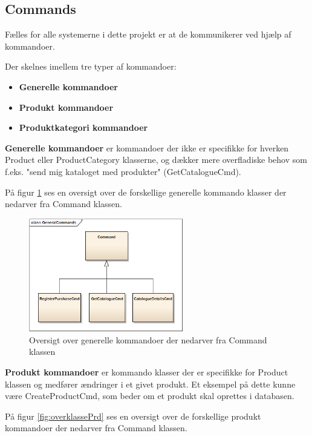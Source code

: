 \subsection{Commands}\label{COMMAND}
Fælles for alle systemerne i dette projekt er at de kommunikerer ved hjælp af kommandoer. 

Der skelnes imellem tre typer af kommandoer:

\begin{itemize}
\item \textbf{Generelle kommandoer} 
\item \textbf{Produkt kommandoer} 
\item \textbf{Produktkategori kommandoer}
\end{itemize}

\textbf{Generelle kommandoer} er kommandoer der ikke er specifikke for hverken Product eller ProductCategory klasserne, og dækker mere overfladiske behov som f.eks. "send mig kataloget med produkter" (GetCatalogueCmd).

På figur \ref{fig:overklasseGen} ses en oversigt over de forskellige generelle kommando klasser der nedarver fra Command klassen.

\begin{figure}[H]
    \centering
    \includegraphics[width=0.6\textwidth]{Systemdesign/SharedLib/Images/Commands/GeneralCommands.png}
    \caption{Oversigt over generelle kommandoer der nedarver fra Command klassen}
    \label{fig:overklasseGen}
\end{figure}

\textbf{Produkt kommandoer} er kommando klasser der er specifikke for Product klassen og medfører ændringer i et givet produkt. Et eksempel på dette kunne være CreateProductCmd, som beder om et produkt skal oprettes i databasen.

På figur \ref{fig:overklassePrd} ses en oversigt over de forskellige produkt kommandoer der nedarver fra Command klassen.

